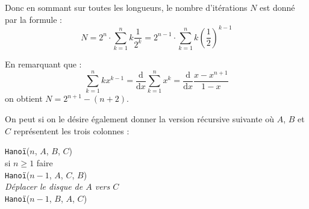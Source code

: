 Donc en sommant sur toutes les longueurs, le nombre d'itérations $N$ est donné par la formule :
\[
    N = 2^n\cdot\sum_{k=1}^nk\frac{1}{2^k}=2^{n-1}\cdot\sum_{k=1}^nk\left(\frac{1}{2}\right)^{k-1}
\]

En remarquant que :
\[
    \sum_{k=1}^nkx^{k-1} = \frac{\textrm{d}}{\textrm{d}x}\sum_{k=1}^nx^k = \frac{\textrm{d}}{\textrm{d}x}\frac{x-x^{n+1}}{1-x}
\]
on obtient $N = 2^{n+1}-(n+2)$.
\medskip

On peut si on le désire également donner la version récursive suivante où $A$, $B$ et $C$ représentent les trois colonnes :
\medskip

\texttt{Hanoï}($n$, $A$, $B$, $C$)\\
\hspace*{2em} si $n \geq 1$ faire\\
\hspace*{4em}   \texttt{Hanoï}($n-1$, $A$, $C$, $B$)\\
\hspace*{4em}   \textit{Déplacer le disque de $A$ vers $C$}\\
\hspace*{4em}   \texttt{Hanoï}($n-1$, $B$, $A$, $C$)
\bigskip

\Fin

